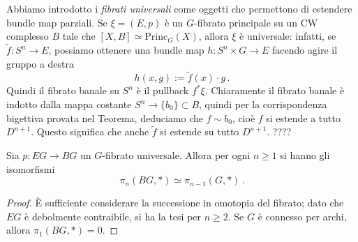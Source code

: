 



Abbiamo introdotto i \emph{fibrati universali}
come oggetti che permettono di estendere bundle map parziali.
Se $\xi=(E,p)$ è un $G$-fibrato principale su un CW complesso $B$
tale che $[X,B] \simeq \mathrm{Princ}_{G}(X)$,
allora $\xi$ è universale: infatti,
se $\widetilde{f}:S^{n} \to E$, possiamo ottenere
una bundle map $h:S^{n} \times G \to E$ facendo agire il gruppo
a destra 
\begin{equation*}
	h(x,g) := \widetilde{f}(x) \cdot g\,.
\end{equation*}
Quindi il fibrato banale su $S^{n}$ è il pullback $f^{*}\xi$.
Chiaramente il fibrato banale è indotto dalla mappa costante $S^{n} \to \{b_{0}\} \subset B$,
quindi per la corrispondenza bigettiva provata nel Teorema,
deduciamo che $f \sim b_{0}$, cioè $f$ si estende a tutto $D^{n+1}$.
Questo significa che anche $\widetilde{f}$ si estende su tutto $D^{n+1}$.
????

\begin{prop}
	Sia $p:EG \to BG$ un $G$-fibrato universale.
	Allora per ogni $n \ge 1$ si hanno gli isomorfismi
	\begin{equation*}
		\pi_{n}(BG,\ast) \simeq \pi_{n-1}(G,\ast)\,.
	\end{equation*}
	\begin{proof}
		È sufficiente considerare la successione in omotopia del fibrato;
		dato che $EG$ è debolmente contraibile, si ha la tesi per $n \ge 2$.
		Se $G$ è connesso per archi, allora $\pi_{1}(BG,\ast)=0$.
	\end{proof}
\end{prop}

